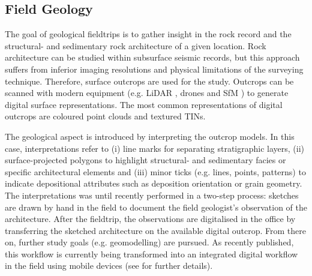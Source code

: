 \documentclass[review]{elsarticle}
\begin{document}
\subsection{Field Geology}

The goal of geological fieldtrips is to gather insight in the rock record and the structural- and sedimentary rock architecture of a given location. Rock architecture can be studied within subsurface seismic records, but this approach suffers from inferior imaging resolutions and physical limitations of the surveying technique. Therefore, surface outcrops are used for the study. Outcrops can be scanned with modern equipment (e.g. \gls{LiDAR} \cite{Buckley2008a,Buckley2010}, drones \cite{Dewez2015} and \gls{SfM} \cite{Chandler2016}) to generate digital surface representations. The most common representations of digital outcrops are coloured point clouds and textured \glspl{TIN}.

The geological aspect is introduced by interpreting the outcrop models. In this case, interpretations refer to (i) line marks for separating stratigraphic layers, (ii) surface-projected polygons to highlight structural- and sedimentary facies or specific architectural elements and (iii) minor ticks (e.g. lines, points, patterns) to indicate depositional attributes such as deposition orientation or grain geometry. The interpretations was until recently performed in a two-step process: sketches are drawn by hand in the field to document the field geologist's observation of the architecture. After the fieldtrip, the observations are digitalised in the office by transferring the sketched architecture on the available digital outcrop. From there on, further study goals (e.g. geomodelling) are pursued. As recently published, this workflow is currently being transformed into an integrated digital workflow in the field using mobile devices (see \cite{Kehl2018_AGU} for further details).
\end{document}
